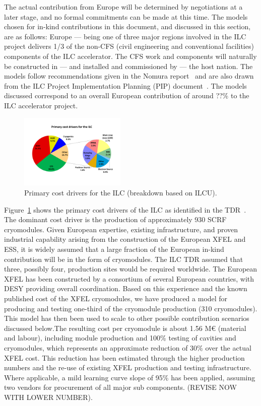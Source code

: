 \documentclass[%
 reprint,
 amsmath,amssymb,
 aps,
]{revtex4-1}
\begin{document}
The actual contribution from Europe will be determined by negotiations at a 
later stage, and no formal commitments can be made at this time. The models 
chosen for in-kind contributions in this document, and discussed in this 
section, are as follows: Europe — being one of three major regions involved in 
the ILC project delivers 1/3 of the non-CFS (civil engineering and conventional facilities) 
components of the ILC accelerator. The CFS work 
and components will naturally be constructed in — and installed and 
commissioned by — the host nation. The models follow recommendations given in 
the Nomura report~\cite{Nomura-eng} and are also drawn from the ILC Project Implementation 
Planning (PIP) document~\cite{ILCPIP}. The models discussed correspond to an overall 
European contribution of around ??\% to the ILC accelerator project. 

\begin{figure}[htbp]
\begin{center}
\includegraphics[width=0.45\textwidth]{figures/eap-chp3-ilccostdrivers.pdf}
 \caption{\label{fig:constructionmodel:ILCPrimaryCostDrivers} Primary cost drivers for the ILC (breakdown based on ILCU).}
\end{center}
\end{figure}

Figure~\ref{fig:constructionmodel:ILCPrimaryCostDrivers} shows the primary cost drivers of the ILC as identified in the TDR~\cite{Adolphsen:2013kya}. The dominant cost driver is the production of approximately 930 SCRF cryomodules. Given European expertise, 
existing infrastructure, and proven industrial capability arising from the construction 
of the European XFEL and ESS, it is widely assumed that a large fraction of the European in-kind contribution 
will be in the form of cryomodules. The ILC TDR assumed that three, possibly four, production sites 
would be required worldwide. 
The European XFEL has been constructed by a consortium of several European countries, with DESY providing overall coordination. Based on this experience and the known published cost of the XFEL cryomodules, we have produced a model for producing and testing one-third of the cryomodule production (310 cryomodules). This model has then been used to scale to other possible contribution scenarios discussed below.The resulting cost per cryomodule is about 1.56 M\euro{} (material and labour), including module production and 100\% testing of cavities and cryomodules, which represents an approximate reduction of 30\% over the actual XFEL cost. This reduction has been estimated through the higher production numbers and the re-use of existing XFEL production and testing infrastructure.  Where applicable, a mild learning curve slope of 95\% has been applied, assuming two vendors for procurement of all major sub components. (REVISE NOW WITH LOWER NUMBER).
\end{document}
